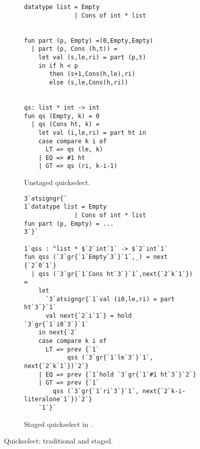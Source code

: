 
\begin{figure}[t]
\begin{subfigure}{0.5\textwidth}
\begin{lstlisting} 
datatype list = Empty 
              | Cons of int * list


fun part (p, Empty) =(0,Empty,Empty) 
  | part (p, Cons (h,t)) = 
    let val (s,le,ri) = part (p,t) 
    in if h < p 
       then (s+1,Cons(h,le),ri) 
       else (s,le,Cons(h,ri))


qs: list * int -> int
fun qs (Empty, k) = 0
  | qs (Cons ht, k) =
    let val (i,le,ri) = part ht in 
    case compare k i of
      LT => qs (le, k)
    | EQ => #1 ht
    | GT => qs (ri, k-i-1)

\end{lstlisting}
\caption{Unstaged quickselect.}
\label{fig:qs-unstaged}
\end{subfigure}
\hfill
\begin{subfigure}{0.5\textwidth}
\begin{lstlisting} 
3`atsigngr{`  
1`datatype list = Empty 
              | Cons of int * list
fun part (p, Empty) = ... 
3`}`

1`qss : ^list * $`2`int`1` -> $`2`int`1`
fun qss (`3`gr{`1`Empty`3`}`1`,_) = next {`2`0`1`}
  | qss (`3`gr{`1`Cons ht`3`}`1`,next{`2`k`1`}) = 
    let 
      `3`atsigngr{`1`val (i0,le,ri) = part ht`3`}`1`
      val next{`2`i`1`} = hold `3`gr{`1`i0`3`}`1`
    in next{`2` 
    case compare k i of
      LT => prev {`1`
            qss (`3`gr{`1`le`3`}`1`, next{`2`k`1`})`2`}
    | EQ => prev {`1`hold `3`gr{`1`#1 ht`3`}`2`}
    | GT => prev {`1`
        qss (`3`gr{`1`ri`3`}`1`, next{`2`k-i-literalone`1`})`2`}
    `1`}`
\end{lstlisting}
\caption{Staged quickselect in \lang.}

\label{fig:qs-staged}
\end{subfigure}
\caption{Quickselect: traditional and staged.}
\end{figure}

